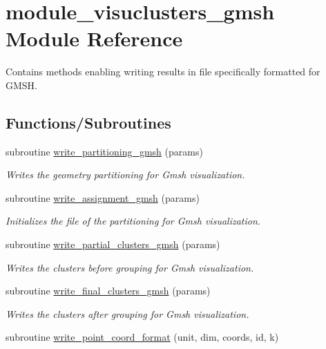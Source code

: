 \hypertarget{namespacemodule__visuclusters__gmsh}{}\section{module\+\_\+visuclusters\+\_\+gmsh Module Reference}
\label{namespacemodule__visuclusters__gmsh}


Contains methods enabling writing results in file specifically formatted for G\+M\+S\+H.  


\subsection*{Functions/\+Subroutines}
\begin{DoxyCompactItemize}
\item 
subroutine \hyperlink{namespacemodule__visuclusters__gmsh_a2ffd04d2e2dcdda290446affaf3a76dc}{write\+\_\+partitioning\+\_\+gmsh} (params)
\begin{DoxyCompactList}\small\item\em Writes the geometry partitioning for Gmsh visualization. \end{DoxyCompactList}\item 
subroutine \hyperlink{namespacemodule__visuclusters__gmsh_a3771400a4e195904654e041eef83247f}{write\+\_\+assignment\+\_\+gmsh} (params)
\begin{DoxyCompactList}\small\item\em Initializes the file of the partitioning for Gmsh visualization. \end{DoxyCompactList}\item 
subroutine \hyperlink{namespacemodule__visuclusters__gmsh_af04ca060cedb92fb755fd6cbb1330011}{write\+\_\+partial\+\_\+clusters\+\_\+gmsh} (params)
\begin{DoxyCompactList}\small\item\em Writes the clusters before grouping for Gmsh visualization. \end{DoxyCompactList}\item 
subroutine \hyperlink{namespacemodule__visuclusters__gmsh_a3fe1790e0267b255e689ead80e6c8ca8}{write\+\_\+final\+\_\+clusters\+\_\+gmsh} (params)
\begin{DoxyCompactList}\small\item\em Writes the clusters after grouping for Gmsh visualization. \end{DoxyCompactList}\item 
subroutine \hyperlink{namespacemodule__visuclusters__gmsh_ab3a87863baf4bd33953b9aa7950d5d26}{write\+\_\+point\+\_\+coord\+\_\+format} (unit, dim, coords, id, k)

\end{DoxyCompactItemize}
